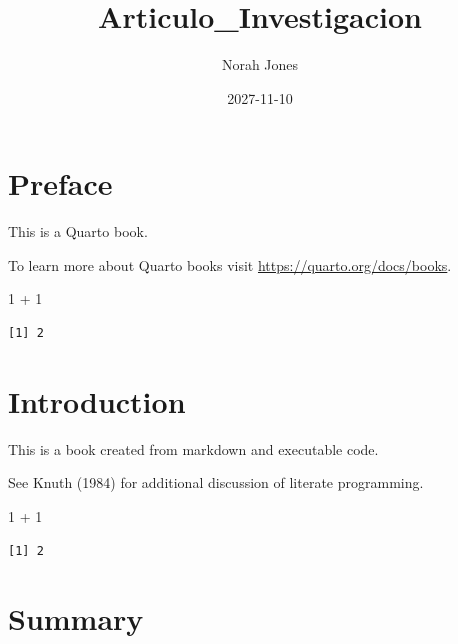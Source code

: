 \documentclass[
  letterpaper,
  DIV=11,
  numbers=noendperiod]{scrreprt}
\title{Articulo\_Investigacion}
\author{Norah Jones}
\date{2027-11-10}
\newenvironment{Shaded}{\begin{snugshade}}{\end{snugshade}}
\newcommand{\DecValTok}[1]{\textcolor[rgb]{0.68,0.00,0.00}{#1}}
\newcommand{\SpecialCharTok}[1]{\textcolor[rgb]{0.37,0.37,0.37}{#1}}
\renewcommand*\contentsname{Table of contents}
\newcommand\contentsname{Table of contents}
\begin{document}
\maketitle

\renewcommand*\contentsname{Table of contents}
{
\setcounter{tocdepth}{2}
\tableofcontents
}


\chapter*{Preface}\label{preface}


This is a Quarto book.

To learn more about Quarto books visit
\url{https://quarto.org/docs/books}.

\begin{Shaded}
\begin{Highlighting}[]
\DecValTok{1} \SpecialCharTok{+} \DecValTok{1}
\end{Highlighting}
\end{Shaded}

\begin{verbatim}
[1] 2
\end{verbatim}


\chapter{Introduction}\label{introduction}

This is a book created from markdown and executable code.

See Knuth (1984) for additional discussion of literate programming.

\begin{Shaded}
\begin{Highlighting}[]
\DecValTok{1} \SpecialCharTok{+} \DecValTok{1}
\end{Highlighting}
\end{Shaded}

\begin{verbatim}
[1] 2
\end{verbatim}


\chapter{Summary}\label{summary}
\end{document}
